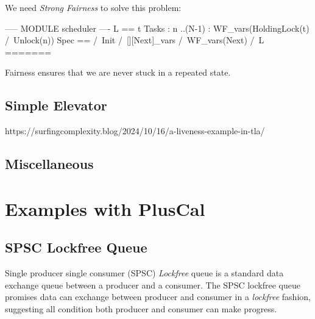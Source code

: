 \documentclass{report}
\begin{document}
We need \textit{Strong Fairness} to solve this problem:
\begin{tla}
----- MODULE scheduler ---- 
L ==
    \A t \in Tasks :
        \A n ..(N-1) :
            WF_vars(HoldingLock(t) /\ Unlock(n))
Spec ==
  /\ Init
  /\ [][Next]_vars
  /\ WF_vars(Next)
  /\ L 
======= 
\end{tla}
\begin{tlatex}
\@x{}\moduleLeftDash{}\moduleRightDash\@xx{}%
%
%
%
%
%
%
%
%
%
\@x{}\bottombar\@xx{}%
\end{tlatex}
\newline

Fairness ensures that we are never stuck in a repeated state.


\chapter{Simple Elevator}

https://surfingcomplexity.blog/2024/10/16/a-liveness-example-in-tla/

\chapter{Miscellaneous}

\part{Examples with PlusCal}

\chapter{SPSC Lockfree Queue}

Single producer single consumer (SPSC) \textit{Lockfree} queue is a standard
data exchange queue between a producer and a consumer. The SPSC lockfree queue
promises data can exchange between producer and consumer in a \textit{lockfree}
fashion, suggesting all condition both producer and consumer can make
progress.\newline
\end{document}
